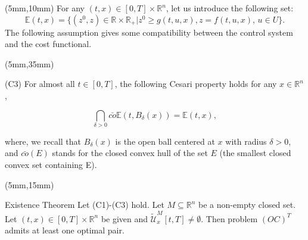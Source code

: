 \documentclass[10pt]{beamer}
\begin{document}
\begin{frame}
\begin{textblock*}{120mm}(5mm,10mm)
	For any $(t,x)\in [0,T]\times\mathbb{R}^n$, let us introduce the following set:
	$$\mathbb{E}(t,x)=\{(z^0,z)\in \mathbb{R}\times \mathbb{R}_{+}|z^0\geq g(t,u,x),z=f(t,u,x),\, u\in U\}.$$
	The following assumption gives some compatibility between the control system and the cost functional.
\end{textblock*}

\begin{textblock*}{120mm}(5mm,35mm)
	\begin{graybox}{(C3)}
		For almost all $t\in [0,T]$, the following Cesari property holds for any $x\in \mathbb{R}^n$,

		$$\bigcap_{\delta>0}\bar{co}\mathbb{E}(t,B_{\delta}(x))=\mathbb{E}(t,x),$$

		where, we recall that $B_{\delta}(x)$ is the open ball centered at $x$ with radius $\delta>0$, and $\bar{co}(E)$ stands for the closed convex hull of the set $E$ (the 	smallest closed convex set containing E).
	\end{graybox}
\end{textblock*}


\end{frame}







\begin{frame}
	\begin{textblock*}{120mm}(5mm,15mm)
		\begin{graybox}{Existence Theorem}
			Let (C1)-(C3) hold. Let $M\subseteq \mathbb{R}^n$ be a non-empty closed set. Let $(t,x)\in [0,T]\times\mathbb{R}^n$ be given and $\tilde{\mathcal{U}}^M_x[t,T]\neq\emptyset$. Then problem $(OC)^T$ admits at least one optimal pair.
		\end{graybox}
	\end{textblock*}
\end{frame}

\begin{frame}

\end{frame}
\end{document}
